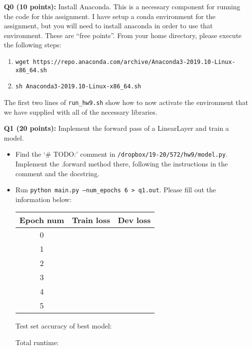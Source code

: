 \documentclass[11pt]{article}
\begin{document}
\vspace{0.4 in}
\noindent
{\bf Q0 (10 points):} Install Anaconda. This is a necessary component for running the code for this assignment.  I have setup a conda environment for the assignment, but you will need to install anaconda in order to use that environment.  These are ``free points''.  From your home directory, please execute the following steps:
\begin{enumerate}
	\item \texttt{wget https://repo.anaconda.com/archive/Anaconda3-2019.10-Linux-x86\_64.sh}
	\item \texttt{sh Anaconda3-2019.10-Linux-x86\_64.sh}
\end{enumerate}
The first two lines of \texttt{run\_hw9.sh} show how to now activate the environment that we have supplied with all of the necessary libraries.


\vspace{0.4 in}
\noindent
{\bf Q1 (20 points):} Implement the forward pass of a LinearLayer and train a model.  
\begin{itemize}
	\item Find the `\# TODO:' comment in \texttt{/dropbox/19-20/572/hw9/model.py}.  Implement the .forward method there, following the instructions in the comment and the docstring.
	\item Run \texttt{python main.py --num\_epochs 6 > q1.out}.  Please fill out the information below:
		\begin{center}
		\begin{tabular}[h]{ccc}
			\toprule
			Epoch num & Train loss & Dev loss \\
			\midrule
			0 & & \\
			1 & & \\
			2 & & \\
			3 & & \\
			4 & & \\
			5 & & \\
			\bottomrule
		\end{tabular}
		\end{center}
		Test set accuracy of best model:

		Total runtime:
\end{itemize}
\end{document}
